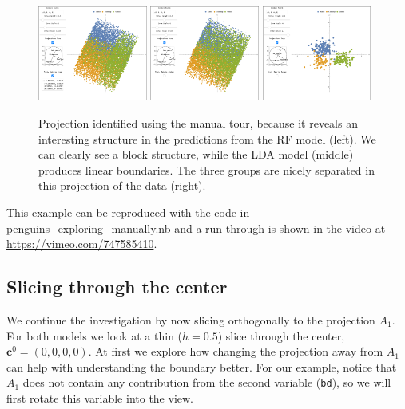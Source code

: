 \documentclass[]{interact}
\theoremstyle{plain}%
\theoremstyle{definition}
\theoremstyle{remark}
\begin{document}
\begin{figure}[ht]
\centerline{\includegraphics[width=0.32\textwidth]{figures/proj1_rf.png}
\includegraphics[width=0.32\textwidth]{figures/proj1_lda.png}
\includegraphics[width=0.32\textwidth]{figures/proj1_data.png}}
\caption{Projection identified using the manual tour, because it reveals an interesting structure in the predictions from the RF model (left). We can clearly see a block structure, while the LDA model (middle) produces linear boundaries. The three groups are nicely separated in this projection of the data (right).}
\label{proj1}
\end{figure}

This example can be reproduced with the code in
penguins\_exploring\_manually.nb and a run through is shown in the video
at \url{https://vimeo.com/747585410}.

\hypertarget{slicing-through-the-center}{%
\subsection{Slicing through the
center}\label{slicing-through-the-center}}

We continue the investigation by now slicing orthogonally to the
projection \(A_1\). For both models we look at a thin (\(h=0.5\)) slice
through the center, \(\mathbf{c}^0 = (0,0,0,0)\). At first we explore
how changing the projection away from \(A_1\) can help with
understanding the boundary better. For our example, notice that \(A_1\)
does not contain any contribution from the second variable
(\texttt{bd}), so we will first rotate this variable into the view.
\end{document}
